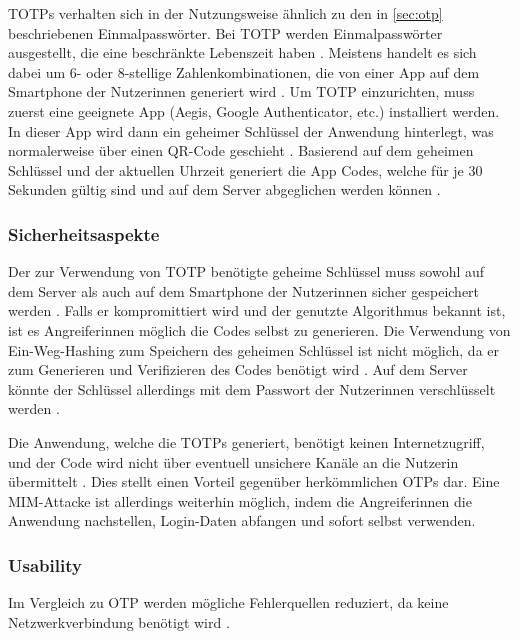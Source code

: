 \acfp{TOTP} verhalten sich in der Nutzungsweise ähnlich zu den in \ref{sec:otp} beschriebenen Einmalpasswörter. Bei \ac{TOTP} werden Einmalpasswörter ausgestellt, die eine beschränkte Lebenszeit haben \parencite{decristofaroComparativeUsability2014}. Meistens handelt es sich dabei um 6- oder 8-stellige Zahlenkombinationen, die von einer App auf dem Smartphone der Nutzerinnen generiert wird \parencite{decristofaroComparativeUsability2014}. Um \ac{TOTP} einzurichten, muss zuerst eine geeignete App (Aegis, Google Authenticator, etc.) installiert werden. In dieser App wird dann ein geheimer Schlüssel der Anwendung hinterlegt, was normalerweise über einen QR-Code geschieht \parencite{reeseUsabilityStudy2019}. Basierend auf dem geheimen Schlüssel und der aktuellen Uhrzeit generiert die App Codes, welche für je 30 Sekunden gültig sind und auf dem Server abgeglichen werden können \parencite{reeseUsabilityStudy2019}.

\subsubsection{Sicherheitsaspekte}

Der zur Verwendung von \ac{TOTP} benötigte geheime Schlüssel muss sowohl auf dem Server als auch auf dem Smartphone der Nutzerinnen sicher gespeichert werden \parencite{reeseUsabilityStudy2019}. Falls er kompromittiert wird und der genutzte Algorithmus bekannt ist, ist es Angreiferinnen möglich die Codes selbst zu generieren. Die Verwendung von Ein-Weg-Hashing zum Speichern des geheimen Schlüssel ist nicht möglich, da er zum Generieren und Verifizieren des Codes benötigt wird \parencite{reeseUsabilityStudy2019}. Auf dem Server könnte der Schlüssel allerdings mit dem Passwort der Nutzerinnen verschlüsselt werden \parencite{reeseUsabilityStudy2019}.

Die Anwendung, welche die \acp{TOTP} generiert, benötigt keinen Internetzugriff, und der Code wird nicht über eventuell unsichere Kanäle an die Nutzerin übermittelt \parencite{reeseUsabilityStudy2019}. Dies stellt einen Vorteil gegenüber herkömmlichen \acp{OTP} dar. Eine \ac{MIM}-Attacke ist allerdings weiterhin möglich, indem die Angreiferinnen die Anwendung nachstellen, Login-Daten abfangen und sofort selbst verwenden.

\subsubsection{Usability}

Im Vergleich zu \ac{OTP} werden mögliche Fehlerquellen reduziert, da keine Netzwerkverbindung benötigt wird \parencite{reeseUsabilityStudy2019}.

